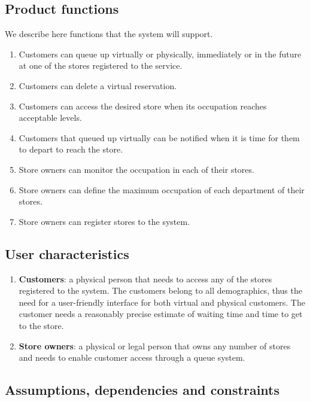 \subsection{Product functions}
We describe here functions that the system will support.
\begin{enumerate}
	\item Customers can queue up virtually or physically, immediately or in the future at one of the stores registered to the service.
	\item Customers can delete a virtual reservation.
	\item Customers can access the desired store when its occupation reaches acceptable levels.
	\item Customers that queued up virtually can be notified when it is time for them to depart to reach the store.
	\item Store owners can monitor the occupation in each of their stores.
	\item Store owners can define the maximum occupation of each department of their stores.
	\item Store owners can register stores to the system.
\end{enumerate}

\subsection{User characteristics}
\begin{enumerate}
	\item {\bfseries Customers}: a physical person that needs to access any of the stores registered to the system. The customers belong to all demographics, thus the need for a user-friendly interface for both virtual and physical customers. The customer needs a reasonably precise estimate of waiting time and time to get to the store.
	\item {\bfseries Store owners}: a physical or legal person that owns any number of stores and needs to enable customer access through a queue system.
\end{enumerate}

\subsection{Assumptions, dependencies and constraints}
